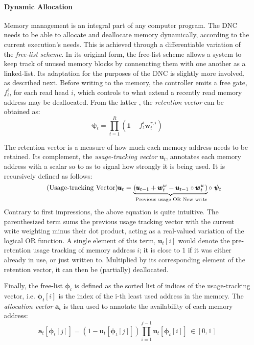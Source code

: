 \documentclass[]{article}
\begin{document}
\paragraph{Dynamic Allocation} Memory management is an integral part of any computer program. The DNC needs to be able to allocate and deallocate memory dynamically, according to the current execution's needs. This is achieved through a differentiable variation of the \textit{free-list scheme}. In its original form, the free-list scheme allows a system to keep track of unused memory blocks by connencting them with one another as a linked-list. Its adaptation for the purposes of the DNC is slightly more involved, as described next. Before writing to the memory, the controller emits a free gate, $f_t^i$, for each read head $i$, which controls to what extend a recently read memory address may be deallocated. From the latter , the \textit{retention vector} can be obtained as:
\[
\tag{Retention Vector}
\pmb{\psi}_t = \prod\limits_{i=1}^{R}{(\pmb{1}-f_t^i \pmb{w}_t^{r,i})}
\]

The retention vector is a measure of how much each memory address needs to be retained. Its complement, the \textit{usage-tracking vector} $\pmb{u}_t$, annotates each memory address with a scalar so to as to signal how strongly it is being used. It is recursively defined as follows:
\[
\tag{Usage-tracking Vector}
\pmb{u}_t = \underbrace{(\pmb{u}_{t-1} + \pmb{w}_{t}^{w} - \pmb{u}_{t-1} \circ \pmb{w}_t^{w})}_{\text{ \scriptsize Previous usage OR New write}} \circ \ \pmb{\psi}_t
\]
Contrary to first impressions, the above equation is quite intuitive. The parenthesized term sums the previous usage tracking vector with the current write weighting minus their dot product, acting as a real-valued variation of the logical OR function. A single element of this term, $\pmb{u}_t[i]$ would denote the pre-retention usage tracking of memory address $i$; it is close to $1$ if it was either already in use, or just written to. Multiplied by its corresponding element of the retention vector, it can then be (partially) deallocated.
 
Finally, the free-list $\pmb{\phi}_t$ is defined as the sorted list of indices of the usage-tracking vector, i.e. $\pmb{\phi}_t[i]$ is the index of the i-th least used address in the memory. The \textit{allocation vector} $\pmb{a}_t$ is then  used to annotate the availability of each memory address:
\[
\tag{Allocation Vector}
\label{eqn:Allocation Vector}
\pmb{a}_t[\pmb{\phi}_t[j]] = (1 - \pmb{u}_t[\pmb{\phi}_t[j]])\prod\limits_{i=1}^{j-1}{\pmb{u}_t[\pmb{\phi}_t[i]]} \ \in [0,1]
\]
\end{document}
